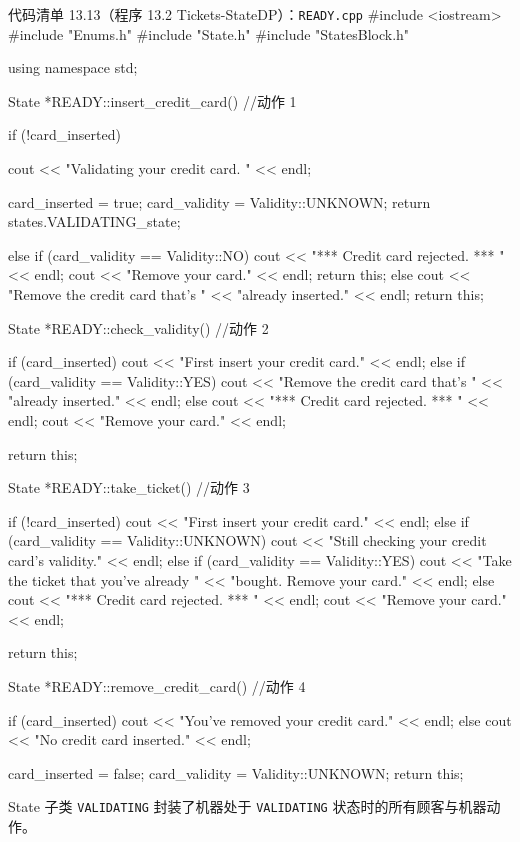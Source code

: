 \begin{codeboxt}{代码清单 13.13（程序 13.2 Tickets-StateDP）：\texttt{READY.cpp}}
#include <iostream>
#include "Enums.h"
#include "State.h"
#include "StatesBlock.h"

using namespace std;

State *READY::insert_credit_card()  //动作 1
{
    if (!card_inserted)
    {
        cout << "Validating your credit card. " << endl;

        card_inserted = true;
        card_validity = Validity::UNKNOWN;
        return states.VALIDATING_state;
    }
    else if (card_validity == Validity::NO)
    {
        cout << "*** Credit card rejected. *** " << endl;
        cout << "Remove your card." << endl;
        return this;
    }
    else
    {
        cout << "Remove the credit card that’s "
             << "already inserted." << endl;
        return this;
    }
}

State *READY::check_validity()  //动作 2
{
    if (card_inserted)
    {
        cout << "First insert your credit card." << endl;
    }
    else if (card_validity == Validity::YES)
    {
        cout << "Remove the credit card that’s "
             << "already inserted." << endl;
    }
    else
    {
        cout << "*** Credit card rejected. *** " << endl;
        cout << "Remove your card." << endl;
    }

    return this;
}

State *READY::take_ticket()  //动作 3
{
    if (!card_inserted)
    {
        cout << "First insert your credit card." << endl;
    }
    else if (card_validity == Validity::UNKNOWN)
    {
        cout << "Still checking your credit card’s validity." 
             << endl;
    }
    else if (card_validity == Validity::YES)
    {
        cout << "Take the ticket that you’ve already "
             << "bought. Remove your card." << endl;
    }
    else
    {
        cout << "*** Credit card rejected. *** " << endl;
        cout << "Remove your card." << endl;
    }

    return this;
}

State *READY::remove_credit_card()  //动作 4
{
    if (card_inserted)
    {
        cout << "You’ve removed your credit card." << endl;
    }
    else
    {
        cout << "No credit card inserted." << endl;
    }

    card_inserted = false;
    card_validity = Validity::UNKNOWN;
    return this;
}
\end{codeboxt}

State 子类 \texttt{VALIDATING} 封装了机器处于 \texttt{VALIDATING} 状态时的所有顾客与机器动作。

